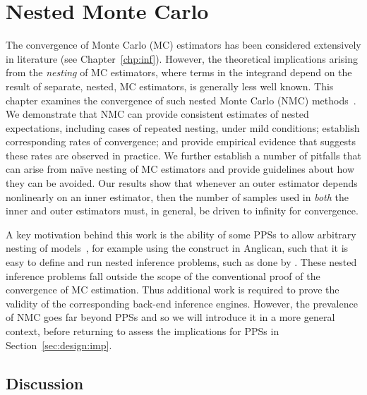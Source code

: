 
\chapter{Nested Monte Carlo}
\label{chp:nest}

The convergence of Monte Carlo (MC) estimators has been considered extensively in 
literature (see Chapter~\ref{chp:inf}).  However, the theoretical implications
arising from the \emph{nesting} of MC estimators, where terms in the integrand depend on the
result of separate, nested, MC estimators, is generally less well known.
This chapter examines the convergence of such nested Monte Carlo (NMC) 
methods~\citep{rainforth2016pitfalls,rainforth2017pitfalls}.
We demonstrate that NMC can provide consistent estimates of 
nested expectations, including cases of repeated nesting, under mild conditions;
establish corresponding rates of convergence;
and provide empirical evidence that suggests these rates are observed in practice.
We further establish a number of pitfalls that can arise from na\"{i}ve nesting of MC estimators
and provide guidelines about how they can be avoided.
Our results show that whenever an outer estimator depends nonlinearly on an inner
estimator, then the number of samples used in \emph{both} the inner and outer estimators
must, in general, be driven to infinity for convergence.  

A key motivation behind this work is the ability of some PPSs to allow
arbitrary nesting of models~\cite{mantadelis2011nesting,stuhlmuller2014reasoning}, for example using
 the \conditional construct in Anglican,
such that it is easy to define and run nested inference problems, such as done
by \citep{ouyang2016practical,le2016nested}. These nested inference problems fall outside the
scope of the conventional proof of the convergence of MC estimation. Thus additional
work is required to prove the validity of the corresponding back-end inference engines.
However, the prevalence of NMC goes far beyond PPSs and so we will introduce it in
a more general context, before returning to assess the implications for PPSs in Section~\ref{sec:design:imp}.










\section{Discussion}
\label{sec:nest:disc}



